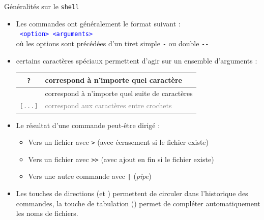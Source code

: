 \documentclass[10pt]{beamer}
\begin{document}
\begin{frame}{\Ctitle}{\stitle}
	\begin{block}{Généralités sur le {\tt shell}}
		\begin{itemize}
			\item<1-> Les commandes ont généralement le format suivant : \\
				\textcolor{blue}{\tt <nom commande> <option> <arguments>} \\
				où les options sont précédées d'un tiret  simple \textcolor{Sepia}{\tt -} ou double \textcolor{Sepia}{\tt -{}-}
			\item<2-> certains caractères spéciaux permettent d'agir sur un ensemble d'arguments : \\
				\begin{tabularx}{0.8\linewidth}{|c|X|}
					\hline
					\textcolor{Sepia}{\tt ?}    & correspond à n'importe quel caractère                      \\
					\hline
					\textcolor{Sepia}{\tt *}    & correspond à n'importe quel suite de caractères            \\
					\hline
					\textcolor{gray}{\tt [...]} & \textcolor{gray}{correspond aux caractères entre crochets} \\
					\hline
				\end{tabularx}
			\item<3-> Le résultat d'une commande peut-être dirigé :
				\begin{itemize}
					\item<4-> Vers un fichier avec \textcolor{Sepia}{\tt >} (avec écrasement si le fichier existe)
					\item<5-> Vers un fichier avec \textcolor{Sepia}{\tt >{}>} (avec ajout en fin si le fichier existe)
					\item<6-> Vers une autre commande avec \textcolor{Sepia}{\tt |} (\textit{pipe})
				\end{itemize}
			\item<4-> Les touches de directions (\UArrow et \DArrow) permettent de circuler dans l'historique des commandes, la touche de tabulation (\Tab) permet de compléter automatiquement les noms de fichiers.

		\end{itemize}
	\end{block}
\end{frame}
\end{document}
